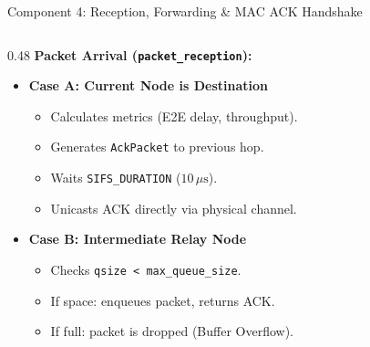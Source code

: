 \documentclass[aspectratio=169,10pt]{beamer}
\begin{document}
\begin{frame}{Component 4: Reception, Forwarding \& MAC ACK Handshake}
  \begin{columns}[T]
    \begin{column}{0.48\textwidth}
      \textbf{Packet Arrival (\texttt{packet\_reception}):}
      \begin{itemize}\setlength{\itemsep}{0.3em}
        \item \textbf{Case A: Current Node is Destination}
          \begin{itemize}\setlength{\itemsep}{0.15em}
            \item Calculates metrics (E2E delay, throughput).
            \item Generates \texttt{AckPacket} to previous hop.
            \item Waits \texttt{SIFS\_DURATION} ($10\,\mu\text{s}$).
            \item Unicasts ACK directly via physical channel.
          \end{itemize}
        \item \textbf{Case B: Intermediate Relay Node}
          \begin{itemize}\setlength{\itemsep}{0.15em}
            \item Checks \texttt{qsize < max\_queue\_size}.
            \item If space: enqueues packet, returns ACK.
            \item If full: packet is dropped (Buffer Overflow).
          \end{itemize}
      \end{itemize}
    \end{column}


\end{columns}
\end{frame}
\end{document}
